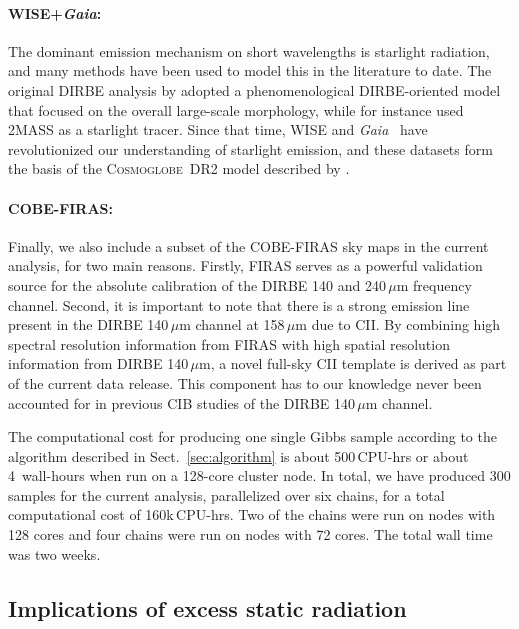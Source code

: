 \documentclass{aa}
\def\Gaia{\textit{Gaia}}
\newcommand{\cosmoglobe}{\textsc{Cosmoglobe}}
\begin{document}
  \paragraph{WISE+\textit{Gaia}:} The dominant emission mechanism on short
  wavelengths is starlight radiation, and many methods have been used
  to model this in the literature to date. The original DIRBE analysis
  by \citet{arendt1998} adopted a phenomenological DIRBE-oriented
  model that focused on the overall large-scale morphology, while for
  instance \citet{wright:2001} used 2MASS as a starlight tracer. Since
  that time, WISE \citep{wright:2010} and \Gaia\ \citep{gaia:2016} have revolutionized our understanding of
  starlight emission, and these datasets form the basis of the
  \cosmoglobe\ DR2 model described by \citet{CG02_04}.

  \paragraph{COBE-FIRAS:} Finally, we also include a subset of the
  COBE-FIRAS \citep{mather:1994} sky maps in the current analysis, for two main
  reasons. Firstly, FIRAS serves as a powerful validation source for
  the absolute calibration of the DIRBE 140 and 240\,$\mu\mathrm{m}$
  frequency channel. Second, it is important to note that there is a
  strong emission line present in the DIRBE 140\,$\mu\mathrm{m}$
  channel at 158$\,\mu\mathrm{m}$ due to CII. By combining high
  spectral resolution information from FIRAS with high spatial
  resolution information from DIRBE 140\,$\mu\mathrm{m}$, a novel
  full-sky CII template is derived as part of the current data
  release. This component has to our knowledge never been accounted
  for in previous CIB studies of the DIRBE 140\,$\mu\mathrm{m}$ channel.

The computational cost for producing one single Gibbs sample according
to the algorithm described in Sect.~\ref{sec:algorithm} is about
500\,CPU-hrs or about 4~wall-hours when run on a 128-core cluster
node. In total, we have produced 300 samples for the current analysis,
parallelized over six chains, for a total computational cost of
160k\,CPU-hrs. Two of the chains were run on nodes with 128 cores and
four chains were run on nodes with 72 cores. The total wall time was
two weeks.


\subsection{Implications of excess static radiation}
\label{sec:excessrad}
\end{document}
